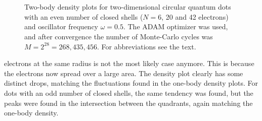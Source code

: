 \begin{figure}[H]
	\centering
	\captionsetup{width=0.9\hsize}
	\captionsetup[subfigure]{labelformat=empty}
	\hspace{0.1cm}
	\\
	
	\hspace{0.1cm}
	\\
	
	\hspace{0.1cm}
	
	\caption{Two-body density plots for two-dimensional circular quantum dots with an even number of closed shells ($N=6$, 20 and 42 electrons) and oscillator frequency $\omega=0.5$. The ADAM optimizer was used, and after convergence the number of Monte-Carlo cycles was $M=2^{28}=268,435,456$. For abbreviations see the text.}%
	\label{fig:TB_interaction_20P}
\end{figure}
\noindent
electrons at the same radius is not the most likely case anymore. This is because the electrons now spread over a large area. The density plot clearly has some distinct drops, matching the fluctuations found in the one-body density plots. For dots with an odd number of closed shells, the same tendency was found, but the peaks were found in the intersection between the quadrants, again matching the one-body density. 

